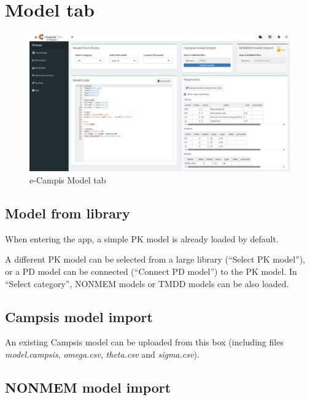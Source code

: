 \documentclass[
]{book}
\theoremstyle{definition}
\theoremstyle{definition}
\theoremstyle{definition}
\theoremstyle{definition}
\theoremstyle{remark}
\begin{document}
\hypertarget{model-tab}{%
\chapter{Model tab}\label{model-tab}}

\begin{figure}
\centering
\includegraphics{ecampsis_model_tab.png}
\caption{e-Campis Model tab}
\end{figure}

\hypertarget{model-from-library}{%
\section{Model from library}\label{model-from-library}}

When entering the app, a simple PK model is already loaded by default.

A different PK model can be selected from a large library (``Select PK model''), or a PD model can be connected (``Connect PD model'') to the PK model. In ``Select category'', NONMEM models or TMDD models can be also loaded.

\hypertarget{campsis-model-import}{%
\section{Campsis model import}\label{campsis-model-import}}

An existing Campsis model can be uploaded from this box (including files \emph{model.campsis}, \emph{omega.csv}, \emph{theta.csv} and \emph{sigma.csv}).

\hypertarget{nonmem-model-import}{%
\section{NONMEM model import}\label{nonmem-model-import}}
\end{document}

